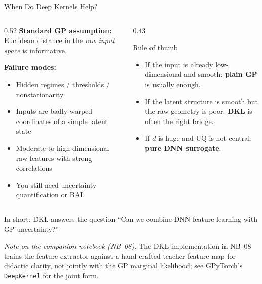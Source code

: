 \documentclass[aspectratio=169,11pt]{beamer}
\newcommand{\emphc}[1]{\textcolor{harvardcrimson}{#1}}
\begin{document}
\begin{frame}{When Do Deep Kernels Help?}
\begin{columns}[T]
\begin{column}{0.52\textwidth}
\textbf{Standard GP assumption:} Euclidean distance in the \emph{raw input space} is informative.

\vspace{0.2cm}
\textbf{Failure modes:}
\begin{itemize}
  \item Hidden regimes / thresholds / nonstationarity
  \item Inputs are badly warped coordinates of a simple latent state
  \item Moderate-to-high-dimensional raw features with strong correlations
  \item You still need \emphc{uncertainty quantification} or BAL
\end{itemize}
\end{column}

\begin{column}{0.43\textwidth}
\begin{alertblock}{Rule of thumb}
\begin{itemize}
  \item If the input is already low-dimensional and smooth: \textbf{plain GP} is usually enough.
  \item If the latent structure is smooth but the raw geometry is poor: \textbf{DKL} is often the right bridge.
  \item If $d$ is huge and UQ is not central: \textbf{pure DNN surrogate}.
\end{itemize}
\end{alertblock}
\end{column}
\end{columns}

\vspace{0.2cm}
{\small In short: \emphc{DKL answers the question ``Can we combine DNN feature learning with GP uncertainty?''}}

\vspace{0.05em}
{\scriptsize\emph{Note on the companion notebook (NB~08).}  The DKL implementation in NB~08 trains the feature extractor against a hand-crafted teacher feature map for didactic clarity, not jointly with the GP marginal likelihood; see GPyTorch's \texttt{DeepKernel} for the joint form.}
\end{frame}
\end{document}
